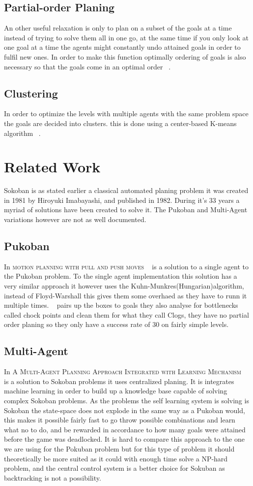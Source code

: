 \documentclass[letterpaper]{article}
\begin{document}
	\subsection{Partial-order Planing}
		An other useful relaxation is only to plan on a subset of the goals at a time instead of trying to solve them all in one go, at the same time if you only look at one goal at a time the agents might constantly undo attained goals in order to fulfil new ones. In order to make this function optimally ordering of goals is also necessary so that the goals come in an optimal order ~\cite{Subgoals}.
	\subsection{Clustering}
		In order to optimize the levels with multiple agents with the same problem space the goals are decided into clusters. this is done using a center-based K-means algorithm ~\cite{K-Means}.

\section{Related Work}
	Sokoban is as stated earlier a classical automated planing problem it was created in 1981 by Hiroyuki Imabayashi, and published in 1982. During it's 33 years a myriad of solutions have been created to solve it.
	The Pukoban and Multi-Agent variations however are not as well documented.
	\subsection{Pukoban}
		In \textsc{motion planning with pull and push moves} ~\cite{Pukoban} is a solution to a single agent to the Pukoban problem. To the single agent implementation this solution has a very similar approach it however uses the Kuhn-Munkres(Hungarian)algorithm, instead of Floyd-Warshall this gives them some overhaed as they have to runn it multiple times.
		~\cite{Pukoban} pairs up the boxes to goals they also analyse for bottlenecks called chock points and clean them for what they call Clogs, they have no partial order planing   so they only have a success rate of 30 on fairly simple levels.
		\subsection{Multi-Agent}
		In \textsc{A Multi-Agent Planning Approach Integrated with Learning Mechanism} ~\cite{Multi-Agent} is a solution to Sokoban problems it uses centralized planing. It is integrates machine learning in order to build up a knowledge base capable of solving complex Sokoban problems. As the problems the self learning system is solving is Sokoban the state-space does not explode in the same way as a Pukoban would, this makes it possible fairly fast to go throw possible combinations and learn what no to do, and be rewarded in accordance to how many goals were attained before the game was deadlocked. It is hard to compare this approach to the one we are using for the Pokuban problem but for this type of problem it should theoretically be more suited as it could with enough time solve a NP-hard problem, and the central control system is a better choice for Sokuban as backtracking is not a possibility.
\end{document}
